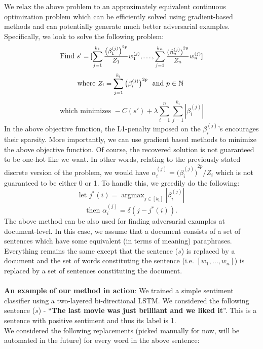 \documentclass[11pt,a4paper]{article}
\DeclareMathOperator*{\argmax}{argmax}
\begin{document}
We relax the above problem to an approximately equivalent continuous optimization problem which can be efficiently solved using gradient-based methods and can potentially generate much better adversarial examples. Specifically, we look to solve the following problem:
\[\text{Find 
\small
$s' = [\sum_{j=1}^{k_{1}}\frac{{\big(\beta_{1}^{(j)}\big)}^{2p}}{Z_{1}}w_{1}^{(j)},\ldots,\sum_{j=1}^{k_{n}}\frac{{(\beta_{n}^{(j)})}^{2p}}{Z_{n}}w_{n}^{(j)}]$}
\normalsize
\]
\[\text{where 
\small
$Z_{i} = \sum_{j=1}^{k_{i}}{\big(\beta_{i}^{(j)}\big)}^{2p}$
\normalsize
\text{ and $p \in \mathbb{N}$}
}\]
\[\text{which minimizes } -C(s') + \lambda \sum_{i=1}^{n}\sum_{j=1}^{k_{i}}|\beta_{i}^{(j)}|\]
In the above objective function, the L1-penalty imposed on the $\beta_{i}^{(j)}$'s encourages their sparsity. More importantly, we can use gradient based methods to minimize the above objective function. Of course, the recovered solution is not guaranteed to be one-hot like we want. In other words, relating to the previously stated discrete version of the problem, we would have
\small
$\alpha_{i}^{(j)} = {\big(\beta_{i}^{(j)}\big)}^{2p}/Z_{i}$
\normalsize
which is not guaranteed to be either 0 or 1. To handle this, we greedily do the following:
\[\text{let $j^{*}(i) = \argmax_{j \in [k_{i}]} |{\beta_{i}^{(j)}}|$}\]
\[\text{then $\alpha_{i}^{(j)} = \delta(j - j^{*}(i))$.}\]
The above method can be also used for finding adversarial examples at document-level. In this case, we assume that a document consists of a set of sentences which have some equivalent (in terms of meaning) paraphrases. %
Everything remains the same except that the sentence ($s$) is replaced by a document and the set of words constituting the sentence (i.e. $[w_{1},\ldots,w_{n}]$) is replaced by a set of sentences constituting the document. 
\\
\\
\textbf{An example of our method in action}: We trained a simple sentiment classifier using a two-layered bi-directional LSTM. We considered the following sentence ({$s$}) -
``\textbf{The last movie was just brilliant and we liked it}''. This is a sentence with positive sentiment and thus its label is 1.
\\
We considered the following replacements (picked manually for now, will be automated in the future) for every word in the above sentence:
\end{document}
